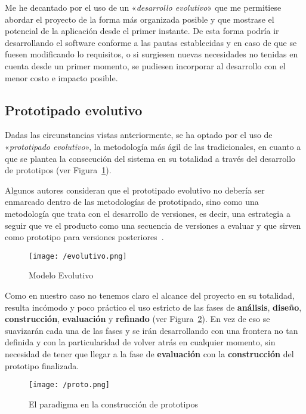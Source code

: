 Me he decantado por el uso de un «\textit{desarrollo evolutivo}» que me permitiese abordar el proyecto de la forma más organizada posible y que mostrase el potencial de la aplicación desde el primer instante. De esta forma podría ir desarrollando el software conforme a las pautas establecidas y en caso de que se fuesen modificando lo requisitos, o si surgiesen nuevas necesidades no tenidas en cuenta desde un primer momento, se pudiesen incorporar al desarrollo con el menor costo e impacto posible.

\subsection{Prototipado evolutivo}

Dadas las circunstancias vistas anteriormente, se ha optado por el uso de «\textit{prototipado evolutivo}», la metodología más ágil de las tradicionales, en cuanto a que se plantea la consecución del sistema en su totalidad a través del desarrollo de prototipos (ver Figura~\ref{fig:evolutivo}). 

Algunos autores consideran que el prototipado evolutivo no debería ser enmarcado dentro de las metodologías de prototipado, sino como una metodología que trata con el desarrollo de versiones, es decir, una estrategia a seguir que ve el producto como una secuencia de versiones a evaluar y que sirven como prototipo para versiones posteriores~\cite{floy_prot}.

\begin{figure}[h]
\centering
\texttt{[image: /evolutivo.png]}
\caption{Modelo Evolutivo~\cite{Evolutivo}}
\label{fig:evolutivo}
\end{figure}

Como en nuestro caso no tenemos claro el alcance del proyecto en su totalidad, resulta incómodo y poco práctico el uso estricto de las fases de \textbf{análisis}, \textbf{diseño}, \textbf{construcción}, \textbf{evaluación} y \textbf{refinado} (ver Figura~\ref{fig:proto}). En vez de eso se suavizarán cada una de las fases y se irán desarrollando con una frontera no tan definida y con la particularidad de volver atrás en cualquier momento, sin necesidad de tener que llegar a la fase de \textbf{evaluación} con la \textbf{construcción} del prototipo finalizada.

\begin{figure}[!h]
\centering
\texttt{[image: /proto.png]}
\caption{El paradigma en la construcción de prototipos~\cite{floy_prot}}
\label{fig:proto}
\end{figure}

